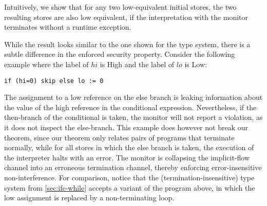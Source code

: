 \documentclass[sigplan,screen]{acmart}\settopmatter{}
\newcommand{\comm}[3]{\ifcheckpagebudget\else\ifdraft{\maybecolor{#1}[#2: #3]}\fi\fi}
\newcommand{\ch}[1]{\comm{teal}{CH}{#1}}
\begin{document}
Intuitively, we show that for any two low-equivalent initial stores,
the two resulting
stores are also low equivalent, if the interpretation with the monitor
terminates without a runtime exception.

While the result looks similar to the one shown for the type system,
there is a subtle difference in the enforced security property. Consider the
following example where the label of \ls$hi$ is High and the label of \ls$lo$
is Low:
\begin{lstlisting}[language=caml]
if (hi=0) skip else lo := 0
\end{lstlisting}
The assignment to a low reference on the else branch is leaking
information about the value of the high reference in the conditional expression.
Nevertheless, if the then-branch of the
conditional is taken, the monitor will not report a violation, as it does not
inspect the else-branch.
This example does however not break our theorem, since our theorem only relates
pairs of programs that terminate normally,
while for all stores in which the else branch
is taken, the execution of the interpreter halts with an error.
%
The monitor is collapsing the implicit-flow channel into an
erroneous termination channel, thereby enforcing error-insensitive
non-interference.
%
%
For comparison, notice that the (termination-insensitive)
type system from \autoref{sec:ifc-while}  accepts a
variant of the program above, in which the low assignment is replaced by a
non-terminating loop.

\end{document}
